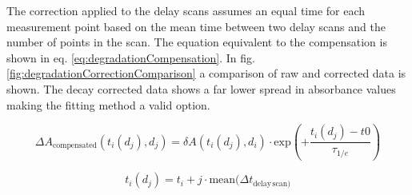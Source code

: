 \documentclass[twoside,openright,listof=numbered]{scrreprt}
\begin{document}
The correction applied to the delay scans assumes an equal time for each measurement point based on the mean time between two delay scans and the number of points in the scan. The equation equivalent to the compensation is shown in eq. \ref{eq:degradationCompensation}. In fig. \ref{fig:degradationCorrectionComparison} a comparison of raw and corrected data is shown. The decay corrected data shows a far lower spread in absorbance values making the fitting method a valid option. 

\begin{equation}\label{eq:degradationCompensation}
\Delta A_\text{compensated}(t_i(d_j), d_j) = \delta A(t_i(d_j), d_i)\cdot \mathrm{exp}\left(+\frac{t_i(d_j)-t0}{\tau_{1/e}}\right)
\end{equation}

\begin{equation*}
t_i(d_j) = t_i + j\cdot \mathrm{mean}(\Delta t_\mathrm{delay\, scan)}
\end{equation*}
\end{document}
